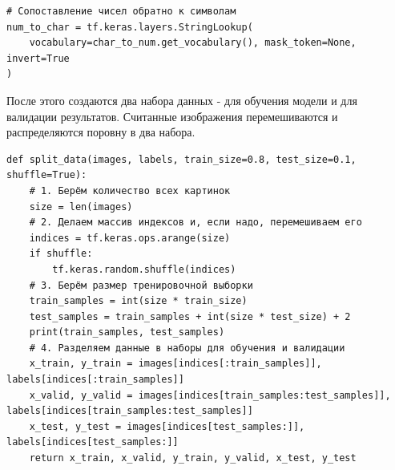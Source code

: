 \documentclass[../document.tex]{subfiles}
\begin{document}
\begin{enumerate}
\begin{verbatim}
# Сопоставление чисел обратно к символам
num_to_char = tf.keras.layers.StringLookup(
    vocabulary=char_to_num.get_vocabulary(), mask_token=None, invert=True
)
\end{verbatim}
\par После этого создаются два набора данных - для обучения модели и для валидации результатов. Считанные изображения перемешиваются и распределяются поровну в два набора.
\begin{verbatim}
def split_data(images, labels, train_size=0.8, test_size=0.1, shuffle=True):
    # 1. Берём количество всех картинок
    size = len(images)
    # 2. Делаем массив индексов и, если надо, перемешиваем его
    indices = tf.keras.ops.arange(size)
    if shuffle:
        tf.keras.random.shuffle(indices)
    # 3. Берём размер тренировочной выборки
    train_samples = int(size * train_size)
    test_samples = train_samples + int(size * test_size) + 2
    print(train_samples, test_samples)
    # 4. Разделяем данные в наборы для обучения и валидации
    x_train, y_train = images[indices[:train_samples]], labels[indices[:train_samples]]
    x_valid, y_valid = images[indices[train_samples:test_samples]], labels[indices[train_samples:test_samples]]
    x_test, y_test = images[indices[test_samples:]], labels[indices[test_samples:]]
    return x_train, x_valid, y_train, y_valid, x_test, y_test



\end{verbatim}
\end{enumerate}
\end{document}
